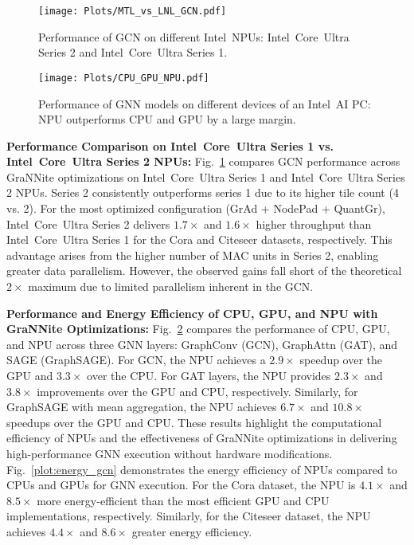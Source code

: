 \begin{figure}[t!]
\begin{center}
\texttt{[image: Plots/MTL\_vs\_LNL\_GCN.pdf]}%
\end{center}
\caption{Performance of GCN on different Intel\textregistered\ NPUs: Intel\textregistered\ Core\texttrademark\ Ultra Series 2 and Intel\textregistered\ Core\texttrademark\ Ultra Series 1.}\label{plot:mtl_vs_lnl}
\end{figure}

\begin{figure}[t!]
\begin{center}
\texttt{[image: Plots/CPU\_GPU\_NPU.pdf]}%
\end{center}
\caption{Performance of GNN models on different devices of an Intel\textregistered\ AI PC: NPU outperforms CPU and GPU by a large margin.}\label{plot:cpu_gpu_npu}
\end{figure}

\textbf{Performance Comparison on Intel\textregistered\ Core\texttrademark\ Ultra Series 1 vs. Intel\textregistered\ Core\texttrademark\ Ultra Series 2 NPUs:} Fig.~\ref{plot:mtl_vs_lnl} compares GCN performance across GraNNite optimizations on Intel\textregistered\ Core\texttrademark\ Ultra Series 1 and Intel\textregistered\ Core\texttrademark\ Ultra Series 2 NPUs. Series 2 consistently outperforms series 1 due to its higher tile count (4 vs. 2). For the most optimized configuration (GrAd + NodePad + QuantGr), Intel\textregistered\ Core\texttrademark\ Ultra Series 2 delivers $1.7\times$ and $1.6\times$ higher throughput than Intel\textregistered\ Core\texttrademark\ Ultra Series 1 for the Cora and Citeseer datasets, respectively. This advantage arises from the higher number of MAC units in Series 2, enabling greater data parallelism. However, the observed gains fall short of the theoretical $2\times$ maximum due to limited parallelism inherent in the GCN.  

\textbf{Performance and Energy Efficiency of CPU, GPU, and NPU with GraNNite Optimizations:} Fig.~\ref{plot:cpu_gpu_npu} compares the performance of CPU, GPU, and NPU across three GNN layers: GraphConv (GCN), GraphAttn (GAT), and SAGE (GraphSAGE). For GCN, the NPU achieves a $2.9\times$ speedup over the GPU and $3.3\times$ over the CPU. For GAT layers, the NPU provides $2.3\times$ and $3.8\times$ improvements over the GPU and CPU, respectively. Similarly, for GraphSAGE with mean aggregation, the NPU achieves $6.7\times$ and $10.8\times$ speedups over the GPU and CPU. These results highlight the computational efficiency of NPUs and the effectiveness of GraNNite optimizations in delivering high-performance GNN execution without hardware modifications.  
Fig.~\ref{plot:energy_gcn} demonstrates the energy efficiency of NPUs compared to CPUs and GPUs for GNN execution. For the Cora dataset, the NPU is $4.1\times$ and $8.5\times$ more energy-efficient than the most efficient GPU and CPU implementations, respectively. Similarly, for the Citeseer dataset, the NPU achieves $4.4\times$ and $8.6\times$ greater energy efficiency.


